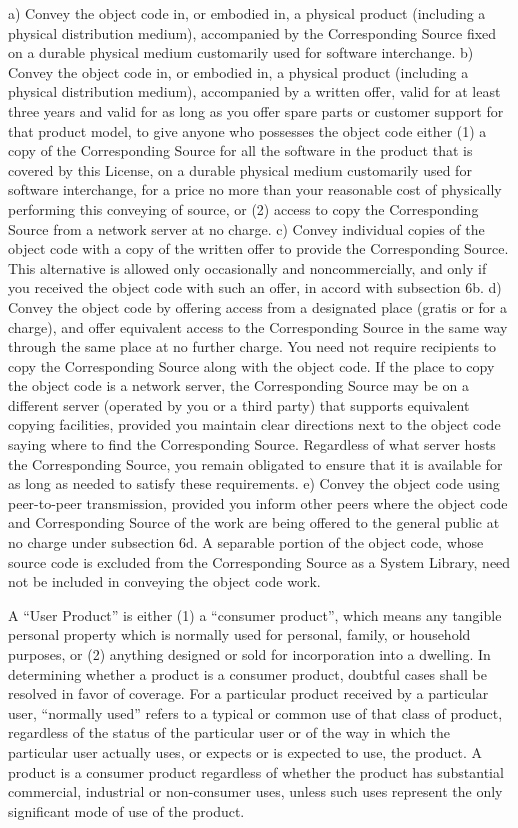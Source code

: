 a) Convey the object code in, or embodied in, a physical product (including a physical distribution medium), accompanied by the Corresponding Source fixed on a durable physical medium customarily used for software interchange.
b) Convey the object code in, or embodied in, a physical product (including a physical distribution medium), accompanied by a written offer, valid for at least three years and valid for as long as you offer spare parts or customer support for that product model, to give anyone who possesses the object code either (1) a copy of the Corresponding Source for all the software in the product that is covered by this License, on a durable physical medium customarily used for software interchange, for a price no more than your reasonable cost of physically performing this conveying of source, or (2) access to copy the Corresponding Source from a network server at no charge.
c) Convey individual copies of the object code with a copy of the written offer to provide the Corresponding Source. This alternative is allowed only occasionally and noncommercially, and only if you received the object code with such an offer, in accord with subsection 6b.
d) Convey the object code by offering access from a designated place (gratis or for a charge), and offer equivalent access to the Corresponding Source in the same way through the same place at no further charge. You need not require recipients to copy the Corresponding Source along with the object code. If the place to copy the object code is a network server, the Corresponding Source may be on a different server (operated by you or a third party) that supports equivalent copying facilities, provided you maintain clear directions next to the object code saying where to find the Corresponding Source. Regardless of what server hosts the Corresponding Source, you remain obligated to ensure that it is available for as long as needed to satisfy these requirements.
e) Convey the object code using peer-to-peer transmission, provided you inform other peers where the object code and Corresponding Source of the work are being offered to the general public at no charge under subsection 6d.
A separable portion of the object code, whose source code is excluded from the Corresponding Source as a System Library, need not be included in conveying the object code work.

A “User Product” is either (1) a “consumer product”, which means any tangible personal property which is normally used for personal, family, or household purposes, or (2) anything designed or sold for incorporation into a dwelling. In determining whether a product is a consumer product, doubtful cases shall be resolved in favor of coverage. For a particular product received by a particular user, “normally used” refers to a typical or common use of that class of product, regardless of the status of the particular user or of the way in which the particular user actually uses, or expects or is expected to use, the product. A product is a consumer product regardless of whether the product has substantial commercial, industrial or non-consumer uses, unless such uses represent the only significant mode of use of the product.

